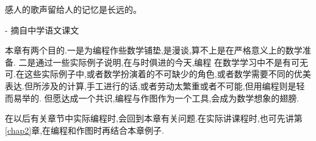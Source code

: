 \documentclass[main.tex]{subfiles}
\begin{document}
\begin{flushright}
	\begin{kaishu}
		感人的歌声留给人的记忆是长远的。\\
	\end{kaishu}
	- 摘自中学语文课文
\end{flushright}

本章有两个目的.一是为编程作些数学铺垫,是漫谈,算不上是在严格意义上的数学准备.
二是通过一些实际例子说明,在与时俱进的今天,编程
在数学学习中不是有可无可.在这些实际例子中,或者数学扮演着的不可缺少的角色,或者数学需要不同的优美表达.但所涉及的计算,手工进行的话,或者劳动太繁重或者不可能,但用编程则是轻而易举的.
但愿达成一个共识,编程与作图作为一个工具,会成为数学想象的翅膀.

在以后有关章节中实际编程时,会回到本章有关问题.在实际讲课程时,也可先讲第\ref{chap2}章,在编程和作图时再结合本章例子.
\end{document}
